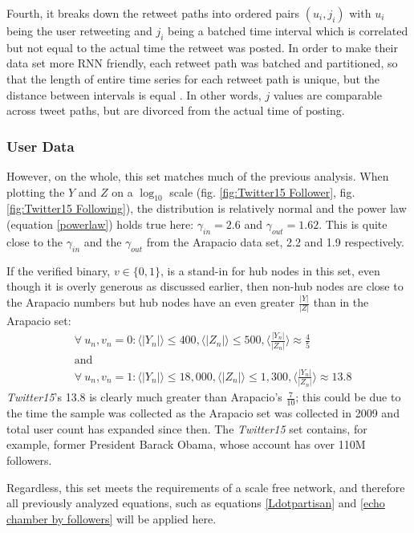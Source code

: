 \documentclass[preprint,review,12pt]{elsarticle}
\begin{document}
Fourth, it breaks down the retweet paths into ordered pairs $(u_i,j_i)$ with $u_i$ being the user retweeting and $j_i$ being a batched time interval which is correlated but not equal to the actual time the retweet was posted. In order to make their data set more RNN friendly, each retweet path was batched and partitioned, so that the length of entire time series for each retweet path is unique, but the distance between intervals is equal \citep{shu2017fake}. In other words, $j$ values are comparable across tweet paths, but are divorced from the actual time of posting.



 \subsubsection{User Data}
However, on the whole, this set matches much of the previous analysis. When plotting the $Y$ and $Z$ on a $\log_{10}$ scale (fig. \ref{fig:Twitter15 Follower}, fig. \ref{fig:Twitter15 Following}), the distribution is relatively normal and the power law (equation \ref{powerlaw}) holds true here:  $\gamma_{in} = 2.6$ and $\gamma_{out} = 1.62$. This is quite close to the $\gamma_{in}$ and the $\gamma_{out}$  from the Arapacio data set, 2.2 and 1.9 respectively.

If the verified binary, $v \in \{0,1\}$, is a stand-in for hub nodes in this set, even though it is overly generous as discussed earlier, then non-hub nodes are close to the Arapacio numbers but hub nodes have an even greater $\frac{|Y|}{|Z|}$ than in the Arapacio set:
\[
\begin{split}
& \forall \ u_n, v_n  = 0:\langle |Y_n| \rangle \leq 400, \langle |Z_n| \rangle \leq 500, \langle  \frac{|Y_n|}{|Z_n|} \rangle \approx \frac{4}{5} \\ &\text{and} \\ & \forall \ u_n, v_n  = 1:\langle |Y_n| \rangle \leq 18,000, \langle |Z_n| \rangle \leq 1,300, \langle  \frac{|Y_n|}{|Z_n|} \rangle \approx 13.8
\end{split}
\]
\textit{Twitter15}'s 13.8 is clearly much greater than Arapacio's $\frac{7}{10}$; this could be due to the time the sample was collected as the Arapacio set was collected in 2009 and total user count has expanded since then. The \textit{Twitter15} set contains, for example, former President Barack Obama, whose account has over 110M followers. 

Regardless, this set meets the requirements of a scale free network, and therefore all previously analyzed equations, such as equations \ref{Ldotpartisan} and \ref{echo chamber by followers} will be applied here.
\end{document}

